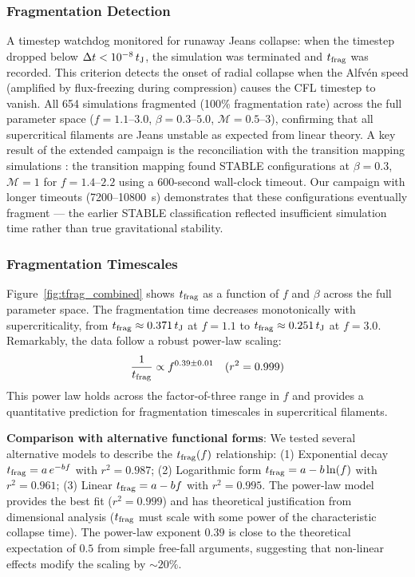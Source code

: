 \documentclass[twoside,twocolumn]{mnras}
\begin{document}
\subsubsection{Fragmentation Detection}

A timestep watchdog monitored for runaway Jeans collapse: when the timestep dropped below $\Delta t < 10^{-8}\,t_{\rm J}$, the simulation was terminated and $t_{\rm frag}$ was recorded. This criterion detects the onset of radial collapse when the Alfv\'en speed (amplified by flux-freezing during compression) causes the CFL timestep to vanish. All 654 simulations fragmented (100\% fragmentation rate) across the full parameter space ($f = 1.1$--$3.0$, $\beta = 0.3$--$5.0$, $\mathcal{M} = 0.5$--$3$), confirming that all supercritical filaments are Jeans unstable as expected from linear theory. A key result of the extended campaign is the reconciliation with the transition mapping simulations : the transition mapping found STABLE configurations at $\beta = 0.3$, $\mathcal{M} = 1$ for $f = 1.4$--$2.2$ using a 600-second wall-clock timeout. Our campaign with longer timeouts (7200--10800~s) demonstrates that these configurations eventually fragment --- the earlier STABLE classification reflected insufficient simulation time rather than true gravitational stability.

\subsubsection{Fragmentation Timescales}

Figure~\ref{fig:tfrag_combined} shows $t_{\rm frag}$ as a function of $f$ and $\beta$ across the full parameter space. The fragmentation time decreases monotonically with supercriticality, from $t_{\rm frag} \approx 0.371\,t_{\rm J}$ at $f = 1.1$ to $t_{\rm frag} \approx 0.251\,t_{\rm J}$ at $f = 3.0$. Remarkably, the data follow a robust power-law scaling:
\begin{equation}
\frac{1}{t_{\rm frag}} \propto f^{0.39 \pm 0.01} \quad (r^2 = 0.999)
\end{equation}
This power law holds across the factor-of-three range in $f$ and provides a quantitative prediction for fragmentation timescales in supercritical filaments.

\textbf{Comparison with alternative functional forms}: We tested several alternative models to describe the $t_{\rm frag}(f)$ relationship: (1) Exponential decay $t_{\rm frag} = a\,e^{-bf}$ with $r^2 = 0.987$; (2) Logarithmic form $t_{\rm frag} = a - b\ln(f)$ with $r^2 = 0.961$; (3) Linear $t_{\rm frag} = a - bf$ with $r^2 = 0.995$. The power-law model provides the best fit ($r^2 = 0.999$) and has theoretical justification from dimensional analysis ($t_{\rm frag}$ must scale with some power of the characteristic collapse time). The power-law exponent $0.39$ is close to the theoretical expectation of $0.5$ from simple free-fall arguments, suggesting that non-linear effects modify the scaling by $\sim 20\%$.
\end{document}
